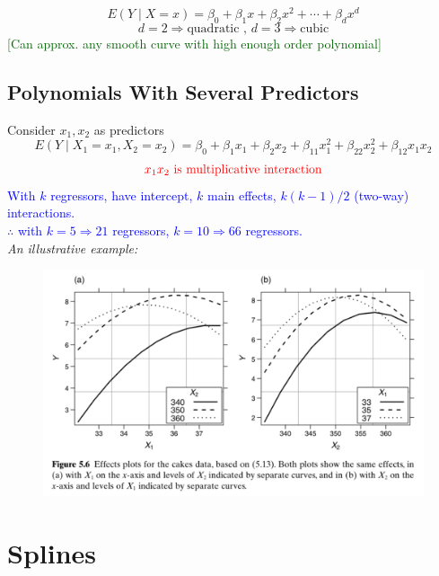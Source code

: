 \documentclass[14pt]{extarticle}
\begin{document}
\[
E(Y \mid X = x) = \beta_0 + \beta_1 x + \beta_2 x^2 + \cdots + \beta_d x^d
\]
\[
d = 2 \Rightarrow \text{quadratic , } d = 3 \Rightarrow \text{cubic}
\]
\noindent
\textcolor{darkgreen}{[Can approx. any smooth curve with high enough order polynomial]}

\subsection*{Polynomials With Several Predictors}

\noindent
Consider $x_1, x_2$ as predictors
\[
E(Y \mid X_1 = x_1, X_2 = x_2) = \beta_0 + \beta_1 x_1 + \beta_2 x_2 + \beta_{11} x_1^2 + \beta_{22} x_2^2 + \beta_{12} x_1 x_2
\]
\[
\textcolor{red}{x_1x_2 \text{ is multiplicative interaction}}
\]
\textcolor{blue}{With $k$ regressors, have intercept, $k$ main effects, $k(k-1)/2$ (two-way) interactions.\\
$\therefore$ with $k = 5 \Rightarrow 21$ regressors, $k = 10 \Rightarrow 66$ regressors.}\\
\textit{An illustrative example:}
\begin{figure}[H]
    \centering
    \includegraphics[width=1\textwidth]{fig31.png}
\end{figure}

\section*{Splines}
\end{document}
